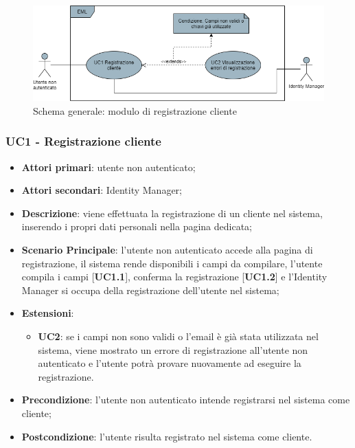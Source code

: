 \begin{figure}[H]
\centering
\includegraphics[scale=0.6]{res/UseCase/Immagini/RegistrazioneGenerale}
\caption{Schema generale: modulo di registrazione cliente}
\end{figure}

\subsubsection{UC1 - Registrazione cliente}
\begin{itemize}
\item \textbf{Attori primari}: utente non autenticato;
\item \textbf{Attori secondari}: Identity Manager;
\item \textbf{Descrizione}: viene effettuata la registrazione di un cliente nel sistema, inserendo i propri dati personali nella pagina dedicata;
\item \textbf{Scenario Principale}: l'utente non autenticato accede alla pagina di registrazione, il sistema rende disponibili i campi da compilare, l'utente compila i campi [\textbf{UC1.1}], conferma la registrazione [\textbf{UC1.2}] e l'Identity Manager si occupa della registrazione dell'utente nel sistema;
\item \textbf{Estensioni}:
\begin{itemize}
\item \textbf{UC2}: se i campi non sono validi o l'email è già stata utilizzata nel sistema, viene mostrato un errore di registrazione all'utente non autenticato e l'utente potrà provare nuovamente ad eseguire la registrazione.
\end{itemize}
\item \textbf{Precondizione}: l'utente non autenticato intende registrarsi nel sistema come cliente;
\item \textbf{Postcondizione}: l'utente risulta registrato nel sistema come cliente.
\end{itemize}

